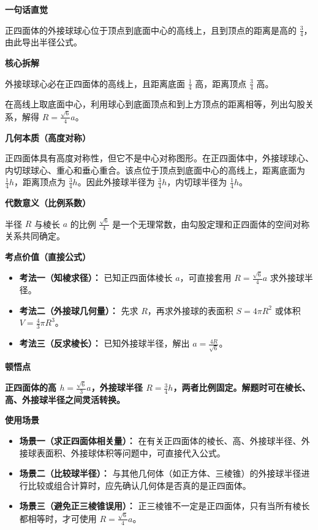 \begin{explanationbox}
	\textbf{\textcolor{CExplanation}{一句话直觉}}

	正四面体的外接球球心位于顶点到底面中心的高线上，且到顶点的距离是高的 $\frac{3}{4}$，由此导出半径公式。

	\medskip
	\textbf{\textcolor{CExplanation}{核心拆解}}
	\begin{description}[style=nextline, leftmargin=2.8em, labelsep=0.5em, itemsep=0.45em]
		\item[\textbf{要点一（球心位置）：}] 外接球球心必在正四面体的高线上，且距离底面 $\frac{1}{4}$ 高，距离顶点 $\frac{3}{4}$ 高。
		\item[\textbf{要点二（勾股关系）：}] 在高线上取底面中心，利用球心到底面顶点和到上方顶点的距离相等，列出勾股关系，解得 $R=\frac{\sqrt{6}}{4}a$。
	\end{description}

	\medskip
	\textbf{\textcolor{CExplanation}{几何本质（高度对称）}}

	正四面体具有高度对称性，但它不是中心对称图形。在正四面体中，外接球球心、内切球球心、重心和垂心重合。该点位于顶点到底面中心的高线上，距离底面为 $\frac{1}{4}h$，距离顶点为 $\frac{3}{4}h$。因此外接球半径为 $\frac{3}{4}h$，内切球半径为 $\frac{1}{4}h$。

	\medskip
	\textbf{\textcolor{CExplanation}{代数意义（比例系数）}}

	半径 $R$ 与棱长 $a$ 的比例 $\frac{\sqrt{6}}{4}$ 是一个无理常数，由勾股定理和正四面体的空间对称关系共同确定。

	\medskip
	\textbf{\textcolor{CExplanation}{考点价值（直接公式）}}
	\begin{itemize}[leftmargin=*, itemsep=0.5em, topsep=0.4em]
		\item \textbf{考法一（知棱求径）：} 已知正四面体棱长 $a$，可直接套用 $R = \frac{\sqrt{6}}{4}a$ 求外接球半径。
		\item \textbf{考法二（外接球几何量）：} 先求 $R$，再求外接球的表面积 $S=4\pi R^2$ 或体积 $V=\frac{4}{3}\pi R^3$。
		\item \textbf{考法三（反求棱长）：} 已知外接球半径，解出 $a = \frac{4R}{\sqrt{6}}$。
	\end{itemize}

	\medskip
	\textbf{\textcolor{CExplanation}{顿悟点}}

	\textbf{正四面体的高 $h = \frac{\sqrt{6}}{3}a$，外接球半径 $R = \frac{3}{4}h$，两者比例固定。解题时可在棱长、高、外接球半径之间灵活转换。}

	\medskip
	\textbf{\textcolor{CExplanation}{使用场景}}
	\begin{itemize}[leftmargin=*, itemsep=0.5em, topsep=0.4em]
		\item \textbf{场景一（求正四面体相关量）：} 在有关正四面体的棱长、高、外接球半径、外接球表面积、外接球体积等问题中，可直接代入公式。
		\item \textbf{场景二（比较球半径）：} 与其他几何体（如正方体、三棱锥）的外接球半径进行比较或组合计算时，应先确认几何体是否真的是正四面体。
		\item \textbf{场景三（避免正三棱锥误用）：} 正三棱锥不一定是正四面体，只有当所有棱长都相等时，才可使用 $R=\frac{\sqrt{6}}{4}a$。
	\end{itemize}
\end{explanationbox}